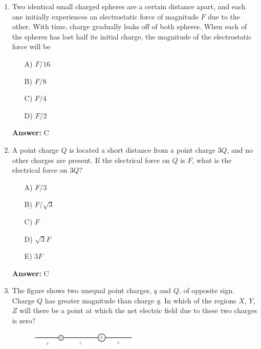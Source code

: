 \begin{enumerate}
    \item Two identical small charged spheres are a certain distance apart, and each one initially experiences an electrostatic force of magnitude $F$ due to the other. With time, charge gradually leaks off of both spheres. When each of the spheres has lost half its initial charge, the magnitude of the electrostatic force will be

\begin{multicols}{5}
    \begin{itemize}
        \item[A)] $F/16$ 
        \item[B)] $F/8$
        \item[C)] $F/4$
        \item[D)] $F/2$
    \end{itemize}
\end{multicols}
   
    
    \textbf{Answer:} C

    \item A point charge $Q$ is located a short distance from a point charge $3Q$, and no other charges are present. If the electrical force on $Q$ is $F$, what is the electrical force on $3Q$?

\begin{multicols}{5}
    \begin{itemize}
        \item[A)] $F/3$ 
        \item[B)] $F/\sqrt{3}$
        \item[C)] $F$
        \item[D)] $\sqrt{3}F$
        \item[E)] $3F$ 
    \end{itemize}
\end{multicols}
    

    \textbf{Answer:} C

    \item The figure shows two unequal point charges, $q$ and $Q$, of opposite sign. Charge $Q$ has greater magnitude than charge $q$. In which of the regions $X$, $Y$, $Z$ will there be a point at which the net electric field due to these two charges is zero?

    \begin{figure}[H]
        \centering
        \includegraphics[width=0.5\textwidth]{figures-workshop01/problem-3.png}
    \end{figure}


\end{enumerate}

